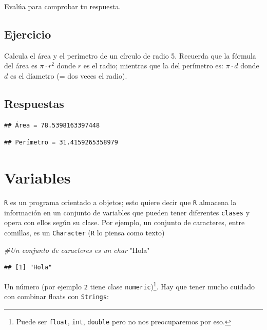 \documentclass[
]{book}
\newenvironment{Shaded}{\begin{snugshade}}{\end{snugshade}}
\newcommand{\CommentTok}[1]{\textcolor[rgb]{0.56,0.35,0.01}{\textit{#1}}}
\newcommand{\StringTok}[1]{\textcolor[rgb]{0.31,0.60,0.02}{#1}}
\begin{document}
Evalúa para comprobar tu respuesta.

\hypertarget{ejercicio-1}{%
\subsection{Ejercicio}\label{ejercicio-1}}

Calcula el área y el perímetro de un círculo de radio 5. Recuerda que la fórmula del área es \(\pi \cdot r^2\) donde \(r\) es el radio; mientras que la del perímetro es: \(\pi \cdot d\) donde \(d\) es el díametro (= dos veces el radio).

\hypertarget{respuestas}{%
\subsection{Respuestas}\label{respuestas}}

\begin{verbatim}
## Área = 78.5398163397448
\end{verbatim}

\begin{verbatim}
## Perímetro = 31.4159265358979
\end{verbatim}

\hypertarget{variables}{%
\section{Variables}\label{variables}}

\texttt{R} es un programa orientado a objetos; esto quiere decir que \texttt{R} almacena la información en un conjunto de variables que pueden tener diferentes \texttt{clases} y opera con ellos según su clase. Por ejemplo, un conjunto de caracteres, entre comillas, es un \texttt{Character} (\texttt{R} lo piensa como texto)

\begin{Shaded}
\begin{Highlighting}[]
\CommentTok{#Un conjunto de caracteres es un char}
\StringTok{"Hola"}
\end{Highlighting}
\end{Shaded}

\begin{verbatim}
## [1] "Hola"
\end{verbatim}

Un número (por ejemplo \texttt{2} tiene clase \texttt{numeric})\footnote{Puede ser \texttt{float}, \texttt{int}, \texttt{double} pero no nos preocuparemos por eso.}. Hay que tener mucho cuidado con combinar floats con \texttt{Strings}:
\end{document}
